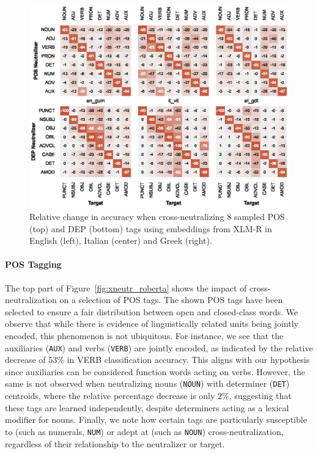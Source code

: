 \documentclass[11pt,a4paper]{article}
\begin{document}
\begin{figure}[t]
\centering
\includegraphics[width=\textwidth]{xlm_multifigure_sampled.eps}
\caption{Relative  change in accuracy when cross-neutralizing 8 sampled POS (top) and DEP (bottom) tags using embeddings from XLM-R in English (left), Italian (center) and Greek (right).}
\label{fig:xneutr_xlmr}
\end{figure}

\paragraph{POS Tagging}
The top part of Figure~\ref{fig:xneutr_roberta} shows the impact of cross-neutralization on a selection of POS tags. The shown POS tags have been selected to ensure a fair distribution between open and closed-class words. We observe that while there is evidence of linguistically related units being jointly encoded, this phenomenon is not ubiquitous. For instance, we see that the auxiliaries (\texttt{AUX}) and verbs (\texttt{VERB}) are jointly encoded, as indicated by the relative decrease of 53\% in VERB classification accuracy. This aligns with our hypothesis since auxiliaries can be considered function words acting on verbs. However, the same is not observed when neutralizing nouns (\texttt{NOUN}) with determiner (\texttt{DET}) centroids, where the relative percentage decrease is only 2\%, suggesting that these tags are learned independently, despite determiners acting as a lexical modifier for nouns. Finally, we note how certain tags are particularly susceptible to (such as numerals, \texttt{NUM}) or adept at (such as \texttt{NOUN}) cross-neutralization, regardless of their relationship to the neutralizer or target.
\end{document}
